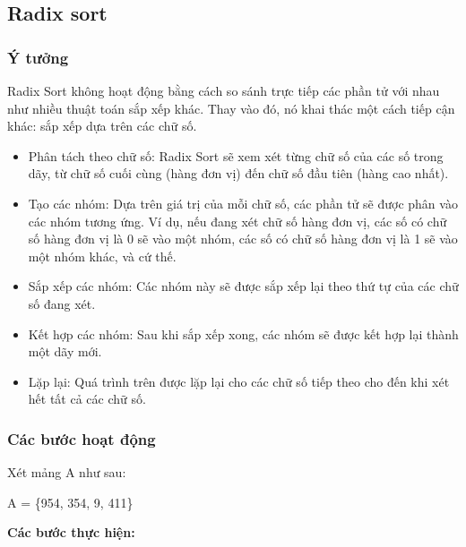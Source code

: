 \subsection{Radix sort}

\subsubsection{Ý tưởng}

Radix Sort không hoạt động bằng cách so sánh trực tiếp các phần tử với nhau như nhiều thuật toán sắp xếp khác. Thay vào đó, nó khai thác một cách tiếp cận khác: sắp xếp dựa trên các chữ số.
\begin{itemize}
    \item Phân tách theo chữ số: Radix Sort sẽ xem xét từng chữ số của các số trong dãy, từ chữ số cuối cùng (hàng đơn vị) đến chữ số đầu tiên (hàng cao nhất).
    \item Tạo các nhóm: Dựa trên giá trị của mỗi chữ số, các phần tử sẽ được phân vào các nhóm tương ứng. Ví dụ, nếu đang xét chữ số hàng đơn vị, các số có chữ số hàng đơn vị là 0 sẽ vào một nhóm, các số có chữ số hàng đơn vị là 1 sẽ vào một nhóm khác, và cứ thế.
    \item Sắp xếp các nhóm: Các nhóm này sẽ được sắp xếp lại theo thứ tự của các chữ số đang xét.
    \item Kết hợp các nhóm: Sau khi sắp xếp xong, các nhóm sẽ được kết hợp lại thành một dãy mới.
    \item Lặp lại: Quá trình trên được lặp lại cho các chữ số tiếp theo cho đến khi xét hết tất cả các chữ số.
\end{itemize}
    

\subsubsection{Các bước hoạt động}
Xét mảng A như sau: 
\begin{center}
   A = \{954, 354, 9, 411\} 
\end{center} 

\textbf{Các bước thực hiện:}

